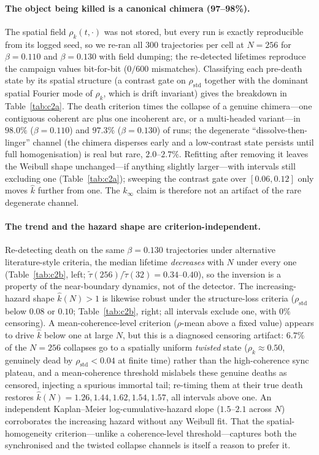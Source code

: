 \documentclass[11pt]{article}
\newcommand{\rhostd}{\rho_{\mathrm{std}}}
\begin{document}
\paragraph{The object being killed is a canonical chimera (97--98\%).} The spatial field
$\rho_k(t,\cdot)$ was not stored, but every run is exactly reproducible from its logged
seed, so we re-ran all $300$ trajectories per cell at $N=256$ for $\beta=0.110$ and
$\beta=0.130$ with field dumping; the re-detected lifetimes reproduce the campaign values
bit-for-bit ($0/600$ mismatches). Classifying each pre-death state by its spatial
structure (a contrast gate on $\rhostd$ together with the dominant spatial Fourier mode of
$\rho_k$, which is drift invariant) gives the breakdown in Table~\ref{tab:c2a}. The death
criterion times the collapse of a genuine chimera---one contiguous coherent arc plus one
incoherent arc, or a multi-headed variant---in $98.0\%$ ($\beta=0.110$) and $97.3\%$
($\beta=0.130$) of runs; the degenerate ``dissolve-then-linger'' channel (the chimera
disperses early and a low-contrast state persists until full homogenisation) is real but
rare, $2.0$--$2.7\%$. Refitting after removing it leaves the Weibull shape unchanged---if
anything slightly larger---with intervals still excluding one (Table~\ref{tab:c2a});
sweeping the contrast gate over $[0.06,0.12]$ only moves $\hat k$ further from one. The
$k_\infty$ claim is therefore not an artifact of the rare degenerate channel.

\paragraph{The trend and the hazard shape are criterion-independent.} Re-detecting death
on the same $\beta=0.130$ trajectories under alternative literature-style criteria, the
median lifetime \emph{decreases} with $N$ under every one (Table~\ref{tab:c2b}, left;
$\tilde\tau(256)/\tilde\tau(32)=0.34$--$0.40$), so the inversion is a property of the
near-boundary dynamics, not of the detector. The increasing-hazard shape $\hat k(N)>1$ is
likewise robust under the structure-loss criteria ($\rhostd$ below $0.08$ or $0.10$;
Table~\ref{tab:c2b}, right; all intervals exclude one, with $0\%$ censoring). A
mean-coherence-level criterion ($\rho$-mean above a fixed value) appears to drive
$\hat k$ below one at large $N$, but this is a diagnosed censoring artifact: $6.7\%$ of
the $N=256$ collapses go to a spatially uniform \emph{twisted} state ($\rho_k\approx0.50$,
genuinely dead by $\rhostd<0.04$ at finite time) rather than the high-coherence sync
plateau, and a mean-coherence threshold mislabels these genuine deaths as censored,
injecting a spurious immortal tail; re-timing them at their true death restores
$\hat k(N)=1.26,1.44,1.62,1.54,1.57$, all intervals above one. An independent
Kaplan--Meier log-cumulative-hazard slope ($1.5$--$2.1$ across $N$) corroborates the
increasing hazard without any Weibull fit. That the spatial-homogeneity criterion---unlike
a coherence-level threshold---captures both the synchronised and the twisted collapse
channels is itself a reason to prefer it.
\end{document}
